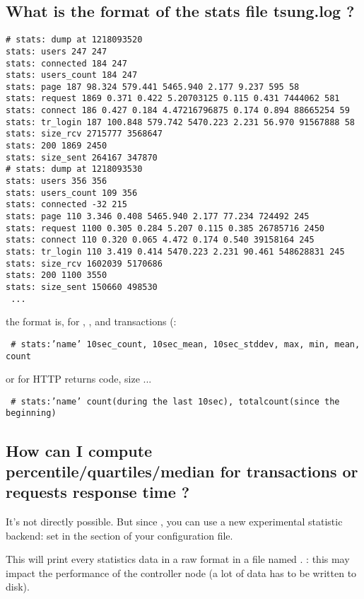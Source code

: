 \documentclass{TSUNG-en}
\begin{document}
\begin{appendix}
\subsection{What is the format of the stats file tsung.log ?}
\label{sec:what-format-stats}
\begin{Verbatim}
# stats: dump at 1218093520
stats: users 247 247
stats: connected 184 247
stats: users_count 184 247
stats: page 187 98.324 579.441 5465.940 2.177 9.237 595 58
stats: request 1869 0.371 0.422 5.20703125 0.115 0.431 7444062 581
stats: connect 186 0.427 0.184 4.47216796875 0.174 0.894 88665254 59
stats: tr_login 187 100.848 579.742 5470.223 2.231 56.970 91567888 58
stats: size_rcv 2715777 3568647
stats: 200 1869 2450
stats: size_sent 264167 347870
# stats: dump at 1218093530
stats: users 356 356
stats: users_count 109 356
stats: connected -32 215
stats: page 110 3.346 0.408 5465.940 2.177 77.234 724492 245
stats: request 1100 0.305 0.284 5.207 0.115 0.385 26785716 2450
stats: connect 110 0.320 0.065 4.472 0.174 0.540 39158164 245
stats: tr_login 110 3.419 0.414 5470.223 2.231 90.461 548628831 245
stats: size_rcv 1602039 5170686
stats: 200 1100 3550
stats: size_sent 150660 498530
 ...
\end{Verbatim}

 the format is, for , ,
  and transactions (:

 \texttt{ \# stats:'name' 10sec\_count, 10sec\_mean, 10sec\_stddev,
   max, min, mean, count}

 or for HTTP returns code, size ...

\texttt{ \# stats:'name' count(during the last 10sec), totalcount(since the beginning)}

\subsection{How can I compute percentile/quartiles/median for transactions or requests
  response time ?}

It's not directly possible. But since , you can
use a new experimental statistic backend: set  in the
 section of your configuration file.

This will print every statistics data in a raw format in a file named
. : this may impact the performance of
the controller node (a lot of data has to be written to disk).


\end{appendix}
\end{document}
